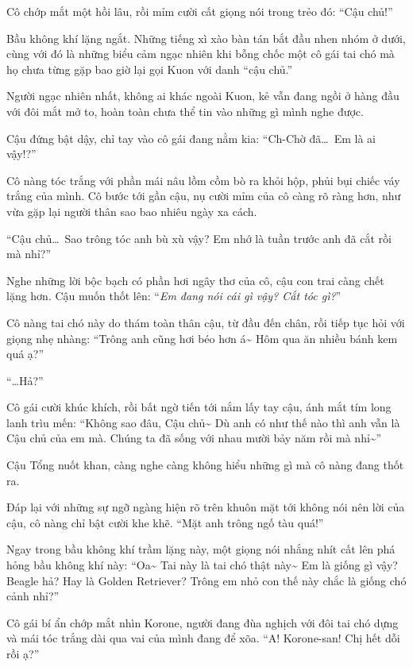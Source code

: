 \documentclass[../main.tex]{subfiles}
\begin{document}
Cô chớp mắt một hồi lâu, rồi mỉm cười cất giọng nói trong trẻo đó: ``Cậu chủ!''

Bầu không khí lặng ngắt. Những tiếng xì xào bàn tán bắt đầu nhen nhóm ở dưới, cùng với đó là những biểu cảm ngạc nhiên khi bỗng chốc một cô gái tai chó mà họ chưa từng gặp bao giờ lại gọi Kuon với danh ``cậu chủ.''

Người ngạc nhiên nhất, không ai khác ngoài Kuon, kẻ vẫn đang ngồi ở hàng đầu với đôi mắt mở to, hoàn toàn chưa thể tin vào những gì mình nghe được.

Cậu đứng bật dậy, chỉ tay vào cô gái đang nằm kia: ``Ch-Chờ đã\dots\ Em là ai vậy!?''

Cô nàng tóc trắng với phần mái nâu lồm cồm bò ra khỏi hộp, phủi bụi chiếc váy trắng của mình. Cô bước tới gần cậu, nụ cười mỉm của cô càng rõ ràng hơn, như vừa gặp lại người thân sao bao nhiêu ngày xa cách.

``Cậu chủ\dots\ Sao trông tóc anh bù xù vậy? Em nhớ là tuần trước anh đã cắt rồi mà nhỉ?''

Nghe những lời bộc bạch có phần hơi ngây thơ của cô, cậu con trai càng chết lặng hơn. Cậu muốn thốt lên: ``\textit{Em đang nói cái gì vậy? Cắt tóc gì?}''

Cô nàng tai chó này do thám toàn thân cậu, từ đầu đến chân, rồi tiếp tục hỏi với giọng nhẹ nhàng: ``Trông anh cũng hơi béo hơn á\~{} Hôm qua ăn nhiều bánh kem quá ạ?''

``\dots Hả?''

Cô gái cười khúc khích, rồi bất ngờ tiến tới nắm lấy tay cậu, ánh mắt tím long lanh trìu mến: ``Không sao đâu, Cậu chủ\~{} Dù anh có như thế nào thì anh vẫn là Cậu chủ của em mà. Chúng ta đã sống với nhau mười bảy năm rồi mà nhỉ\~{}''

Cậu Tổng nuốt khan, càng nghe càng không hiểu những gì mà cô nàng đang thốt ra.

Đáp lại với những sự ngỡ ngàng hiện rõ trên khuôn mặt tới không nói nên lời của cậu, cô nàng chỉ bật cười khe khẽ. ``Mặt anh trông ngố tàu quá!''

Ngay trong bầu không khí trầm lặng này, một giọng nói nhắng nhít cất lên phá hỏng bầu không khí này: ``Oa\~{} Tai này là tai chó thật này\~{} Em là giống gì vậy? Beagle hả? Hay là Golden Retriever? Trông em nhỏ con thế này chắc là giống chó cảnh nhỉ?''

Cô gái bí ẩn chớp mắt nhìn Korone, người đang đùa nghịch với đôi tai chó dựng và mái tóc trắng dài qua vai của mình đang để xõa. ``A! Korone-san! Chị hết dỗi rồi ạ?''
\end{document}
